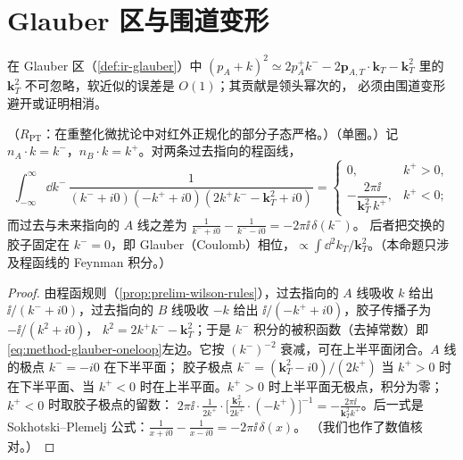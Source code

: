 \section{Glauber 区与围道变形}\label{sec:method-glauber}

在 Glauber 区（\cref{def:ir-glauber}）中 $(p_A+k)^2\simeq2p_A^+k^--2\mathbf p_{A,T}\cdot\mathbf k_T-\mathbf k_T^2$ 里的 $\mathbf k_T^2$ 不可忽略，软近似的误差是 $O(1)$；其贡献是领头幂次的，
必须由围道变形避开或证明相消。

\begin{proposition}\label{prop:method-glauber-oneloop}
（$R_{\mathrm{PT}}$：在重整化微扰论中对红外正规化的部分子态严格。）（单圈。）记 $n_A\cdot k=k^-$，$n_B\cdot k=k^+$。对两条过去指向的程函线，
\begin{equation}\label{eq:method-glauber-oneloop}
\int_{-\infty}^{\infty}\!\dd k^-\,\frac{1}{(k^-+i0)(-k^++i0)(2k^+k^--\mathbf k_T^2+i0)}=
\begin{cases}0,&k^+>0,\\[2pt]-\dfrac{2\pi\ii}{\mathbf k_T^2\,k^+},&k^+<0;\end{cases}
\end{equation}
而过去与未来指向的 $A$ 线之差为 $\frac1{k^-+i0}-\frac1{k^--i0}=-2\pi\ii\,\delta(k^-)$。
后者把交换的胶子固定在 $k^-=0$，即 Glauber（Coulomb）相位，$\propto\int\dd^2k_T/\mathbf k_T^2$。（本命题只涉及程函线的 Feynman 积分。）
\end{proposition}

\begin{proof}
由程函规则（\cref{prop:prelim-wilson-rules}），过去指向的 $A$ 线吸收 $k$ 给出 $\ii/(k^-+i0)$，过去指向的 $B$ 线吸收 $-k$ 给出 $\ii/(-k^++i0)$，胶子传播子为 $-\ii/(k^2+i0)$，
$k^2=2k^+k^--\mathbf k_T^2$；于是 $k^-$ 积分的被积函数（去掉常数）即\cref{eq:method-glauber-oneloop}左边。它按 $(k^-)^{-2}$ 衰减，可在上半平面闭合。$A$ 线的极点 $k^-=-i0$ 在下半平面；
胶子极点 $k^-=(\mathbf k_T^2-i0)/(2k^+)$ 当 $k^+>0$ 时在下半平面、当 $k^+<0$ 时在上半平面。$k^+>0$ 时上半平面无极点，积分为零；$k^+<0$ 时取胶子极点的留数：
$2\pi\ii\cdot\frac1{2k^+}\cdot\bigl[\frac{\mathbf k_T^2}{2k^+}\cdot(-k^+)\bigr]^{-1}=-\frac{2\pi\ii}{\mathbf k_T^2k^+}$。后一式是 Sokhotski--Plemelj 公式：$\frac1{x+i0}-\frac1{x-i0}=-2\pi\ii\,\delta(x)$。
（我们也作了数值核对。）%
\end{proof}

